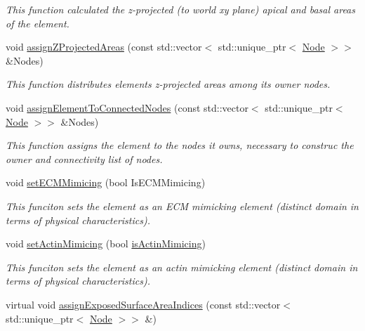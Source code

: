 \begin{DoxyCompactItemize}
\begin{DoxyCompactList}\small\item\em This function calculated the z-\/projected (to world xy plane) apical and basal areas of the element. \end{DoxyCompactList}\item 
\hypertarget{classShapeBase_a6cb53c1b619993aa5b7afd840771cfb0}{}void \hyperlink{classShapeBase_a6cb53c1b619993aa5b7afd840771cfb0}{assign\+Z\+Projected\+Areas} (const std\+::vector$<$ std\+::unique\+\_\+ptr$<$ \hyperlink{classNode}{Node} $>$$>$ \&Nodes)\label{classShapeBase_a6cb53c1b619993aa5b7afd840771cfb0}

\begin{DoxyCompactList}\small\item\em This function distributes element\textquotesingle{}s z-\/projected areas among its owner nodes. \end{DoxyCompactList}\item 
\hypertarget{classShapeBase_a4bc759e8bef0a7b02e8153d6bfb4272c}{}void \hyperlink{classShapeBase_a4bc759e8bef0a7b02e8153d6bfb4272c}{assign\+Element\+To\+Connected\+Nodes} (const std\+::vector$<$ std\+::unique\+\_\+ptr$<$ \hyperlink{classNode}{Node} $>$$>$ \&Nodes)\label{classShapeBase_a4bc759e8bef0a7b02e8153d6bfb4272c}

\begin{DoxyCompactList}\small\item\em This function assigns the element to the nodes it owns, necessary to construc the owner and connectivity list of nodes. \end{DoxyCompactList}\item 
void \hyperlink{classShapeBase_a48f114984fe31a847a9b5485d4622ca1}{set\+E\+C\+M\+Mimicing} (bool Is\+E\+C\+M\+Mimicing)
\begin{DoxyCompactList}\small\item\em This funciton sets the element as an E\+C\+M mimicking element (distinct domain in terms of physical characteristics). \end{DoxyCompactList}\item 
\hypertarget{classShapeBase_ac42c9ed461be059e0558740ed965a8d6}{}void \hyperlink{classShapeBase_ac42c9ed461be059e0558740ed965a8d6}{set\+Actin\+Mimicing} (bool \hyperlink{classShapeBase_a892e478508ed8a375f0816b330e36ac1}{is\+Actin\+Mimicing})\label{classShapeBase_ac42c9ed461be059e0558740ed965a8d6}

\begin{DoxyCompactList}\small\item\em This funciton sets the element as an actin mimicking element (distinct domain in terms of physical characteristics). \end{DoxyCompactList}\item 
\hypertarget{classShapeBase_a0fc635fbfb4e127eed1e449a91c19d13}{}virtual void \hyperlink{classShapeBase_a0fc635fbfb4e127eed1e449a91c19d13}{assign\+Exposed\+Surface\+Area\+Indices} (const std\+::vector$<$ std\+::unique\+\_\+ptr$<$ \hyperlink{classNode}{Node} $>$$>$ \&)\label{classShapeBase_a0fc635fbfb4e127eed1e449a91c19d13}


\end{DoxyCompactItemize}
